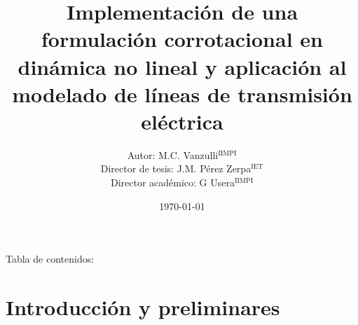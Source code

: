 \documentclass[
  aspectratio=169,
]{beamer}
\begin{document}
	\begin{small}

\title[Maestría en Ingeniería Estructural]{Implementación de una formulación corrotacional en dinámica no lineal y aplicación al modelado de líneas de transmisión eléctrica }
\author[M.C. Vanzulli]{Autor: M.C. Vanzulli$^\text{IIMPI}$  \\Director de tesis: J.M. Pérez Zerpa$^\text{IET}$ \\ Director académico: G Usera$^\text{IIMPI}$ }
\date{\today}

\begin{frame}[plain]
\maketitle
\end{frame}
\begin{frame}{Tabla de contenidos:}
	\tableofcontents
\end{frame}
\section[Introducción y preliminares]{Introducción y preliminares}

\end{small}
\end{document}
